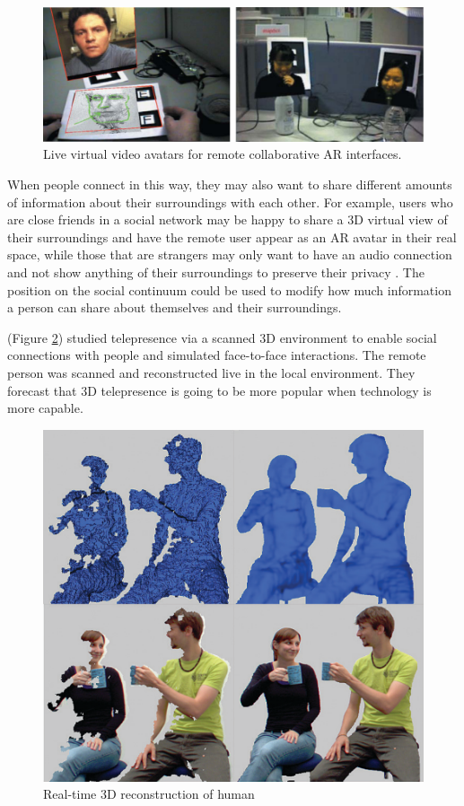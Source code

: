 \begin{figure}
    \centering
    \includegraphics[width=\linewidth]{images/Billinghurst2002.PNG}
    \caption{Live virtual video avatars for remote collaborative AR interfaces. \cite{Billinghurst2002}}
    \label{fig:Billinghurst2002}
\end{figure}

When people connect in this way, they may also want to share different amounts of information about their surroundings with each other. For example, users who are close friends in a social network may be happy to share a 3D virtual view of their surroundings and have the remote user appear as an AR avatar in their real space, while those that are strangers may only want to have an audio connection and not show anything of their surroundings to preserve their privacy \cite{Oetzel2011}. The position on the social continuum could be used to modify how much information a person can share about themselves and their surroundings.

\cite{Fuchs2014} (Figure \ref{fig:Fuchs2014}) studied telepresence via a scanned 3D environment to enable social connections with people and simulated face-to-face interactions. The remote person was scanned and reconstructed live in the local environment. They forecast that 3D telepresence is going to be more popular when technology is more capable.

\begin{figure}
    \centering
    \includegraphics[width=.8\linewidth]{images/Fuchs2014.PNG}
    \caption{Real-time 3D reconstruction of human \cite{Fuchs2014}}
    \label{fig:Fuchs2014}
\end{figure}

